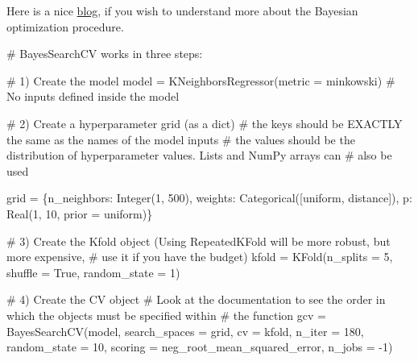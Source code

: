 \documentclass[
  letterpaper,
  DIV=11,
  numbers=noendperiod]{scrreprt}
\newenvironment{Shaded}{\begin{snugshade}}{\end{snugshade}}
\newcommand{\CommentTok}[1]{\textcolor[rgb]{0.37,0.37,0.37}{#1}}
\newcommand{\DecValTok}[1]{\textcolor[rgb]{0.68,0.00,0.00}{#1}}
\newcommand{\NormalTok}[1]{\textcolor[rgb]{0.00,0.23,0.31}{#1}}
\newcommand{\OperatorTok}[1]{\textcolor[rgb]{0.37,0.37,0.37}{#1}}
\newcommand{\StringTok}[1]{\textcolor[rgb]{0.13,0.47,0.30}{#1}}
\newcommand{\VariableTok}[1]{\textcolor[rgb]{0.07,0.07,0.07}{#1}}
\begin{document}
Here is a nice
\href{https://towardsdatascience.com/a-conceptual-explanation-of-bayesian-model-based-hyperparameter-optimization-for-machine-learning-b8172278050f}{blog},
if you wish to understand more about the Bayesian optimization
procedure.

\begin{Shaded}
\begin{Highlighting}[]
\CommentTok{\# BayesSearchCV works in three steps:}

\CommentTok{\# 1) Create the model}
\NormalTok{model }\OperatorTok{=}\NormalTok{ KNeighborsRegressor(metric }\OperatorTok{=} \StringTok{\textquotesingle{}minkowski\textquotesingle{}}\NormalTok{) }\CommentTok{\# No inputs defined inside the model}

\CommentTok{\# 2) Create a hyperparameter grid (as a dict)}
\CommentTok{\# the keys should be EXACTLY the same as the names of the model inputs}
\CommentTok{\# the values should be the distribution of hyperparameter values. Lists and NumPy arrays can}
\CommentTok{\# also be used}
    
\NormalTok{grid }\OperatorTok{=}\NormalTok{ \{}\StringTok{\textquotesingle{}n\_neighbors\textquotesingle{}}\NormalTok{: Integer(}\DecValTok{1}\NormalTok{, }\DecValTok{500}\NormalTok{), }\StringTok{\textquotesingle{}weights\textquotesingle{}}\NormalTok{: Categorical([}\StringTok{\textquotesingle{}uniform\textquotesingle{}}\NormalTok{, }\StringTok{\textquotesingle{}distance\textquotesingle{}}\NormalTok{]), }
       \StringTok{\textquotesingle{}p\textquotesingle{}}\NormalTok{: Real(}\DecValTok{1}\NormalTok{, }\DecValTok{10}\NormalTok{, prior }\OperatorTok{=} \StringTok{\textquotesingle{}uniform\textquotesingle{}}\NormalTok{)\} }

\CommentTok{\# 3) Create the Kfold object (Using RepeatedKFold will be more robust, but more expensive, }
\CommentTok{\# use it if you have the budget)}
\NormalTok{kfold }\OperatorTok{=}\NormalTok{ KFold(n\_splits }\OperatorTok{=} \DecValTok{5}\NormalTok{, shuffle }\OperatorTok{=} \VariableTok{True}\NormalTok{, random\_state }\OperatorTok{=} \DecValTok{1}\NormalTok{)}

\CommentTok{\# 4) Create the CV object}
\CommentTok{\# Look at the documentation to see the order in which the objects must be specified within }
\CommentTok{\# the function}
\NormalTok{gcv }\OperatorTok{=}\NormalTok{ BayesSearchCV(model, search\_spaces }\OperatorTok{=}\NormalTok{ grid, cv }\OperatorTok{=}\NormalTok{ kfold, n\_iter }\OperatorTok{=} \DecValTok{180}\NormalTok{, random\_state }\OperatorTok{=} \DecValTok{10}\NormalTok{,}
\NormalTok{                         scoring }\OperatorTok{=} \StringTok{\textquotesingle{}neg\_root\_mean\_squared\_error\textquotesingle{}}\NormalTok{, n\_jobs }\OperatorTok{=} \OperatorTok{{-}}\DecValTok{1}\NormalTok{)}


\end{Highlighting}
\end{Shaded}
\end{document}
